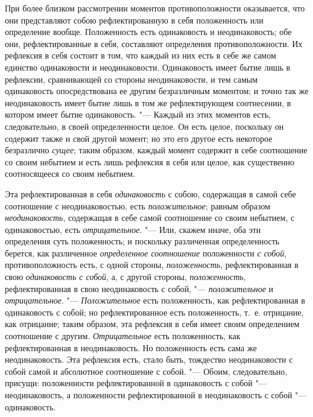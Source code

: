 При более близком рассмотрении моментов противоположности оказывается, что
они представляют собою рефлектированную в себя положенность или определение
вообще. Положенность есть одинаковость и неодинаковость; обе они,
рефлектированные в себя, составляют определения противоположности. Их
рефлексия в себя состоит в том, что каждый из них есть в себе же самом
единство одинаковости и неодинаковости. Одинаковость имеет бытие лишь в
рефлексии, сравнивающей со стороны неодинаковости, и тем самым одинаковость
опосредствована ее другим безразличным моментом; и точно так же
неодинаковость имеет бытие лишь в том же рефлектирующем соотнесении, в
котором имеет бытие одинаковость. "--- Каждый из этих моментов есть,
следовательно, в своей определенности целое. Он есть целое, поскольку он
содержит также и свой другой момент; но это его другое есть некоторое
безразлично {\em сущее}; таким образом, каждый момент
содержит в себе соотношение со своим небытием и есть лишь рефлексия в себя
или целое, как существенно соотносящееся со своим небытием.

Эта рефлектированная в себя {\em одинаковость} с собою,
содержащая в самой себе соотношение с неодинаковостью, есть
{\em положительное}; равным образом
{\em неодинаковость}, содержащая в себе самой
соотношение со своим небытием, с одинаковостью, есть
{\em отрицательное}. "--- Или, скажем иначе, оба эти
определения суть положенность; и поскольку различенная определенность
берется, как различенное {\em определенное соотношение}
положенности {\em с собой}, противоположность есть, с
одной стороны, {\em положенность}, рефлектированная в
свою {\em одинаковость с собой}, а, с другой стороны,
{\em положенность}, рефлектированная в свою
неодинаковость с собой, "--- {\em положительное} и
{\em отрицательное}. "--- {\em Положительное} есть положенность, как
рефлектированная в одинаковость с собой; но рефлектированное есть
положенность, т.~е. отрицание, как отрицание; таким образом, эта рефлексия
в себя имеет своим определением соотношение с другим.
{\em Отрицательное} есть положенность, как
рефлектированная в неодинаковость. Но положенность есть сама же
неодинаковость. Эта рефлексия есть, стало быть, тождество неодинаковости с
собой самой и абсолютное соотношение с собой. "--- Обоим, следовательно,
присущи: положенности рефлектированной в одинаковость с собой
"--- неодинаковость, а положенности рефлектированной в неодинаковость с собой
"--- одинаковость.

